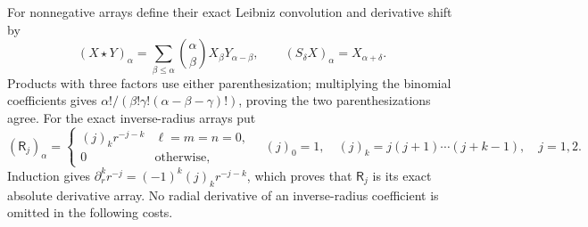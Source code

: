 \documentclass[11pt]{article}
\begin{document}
For nonnegative arrays define their exact Leibniz convolution and
derivative shift by
\begin{equation}\label{mcmean:convolution}
 (X\star Y)_\alpha=\sum_{\beta\le\alpha}
               \binom\alpha\beta X_\beta Y_{\alpha-\beta},
 \qquad (S_\delta X)_\alpha=X_{\alpha+\delta}.
\end{equation}
Products with three factors use either parenthesization; multiplying
the binomial coefficients gives
\(\alpha!/(\beta!\gamma!(\alpha-\beta-\gamma)!)\), proving the
two parenthesizations agree. For the exact inverse-radius arrays put
\begin{equation}\label{mcmean:radius_array}
 (\mathsf R_j)_\alpha=
 \begin{cases}
 (j)_k r^{-j-k}&\ell=m=n=0,\\0&\text{otherwise},
 \end{cases}
 \quad (j)_0=1,\quad(j)_k=j(j+1)\cdots(j+k-1),\quad j=1,2.
\end{equation}
Induction gives \(\partial_r^k r^{-j}=(-1)^k(j)_kr^{-j-k}\),
which proves that \(\mathsf R_j\) is its exact absolute derivative
array. No radial derivative of an inverse-radius coefficient is
omitted in the following costs.
\end{document}
